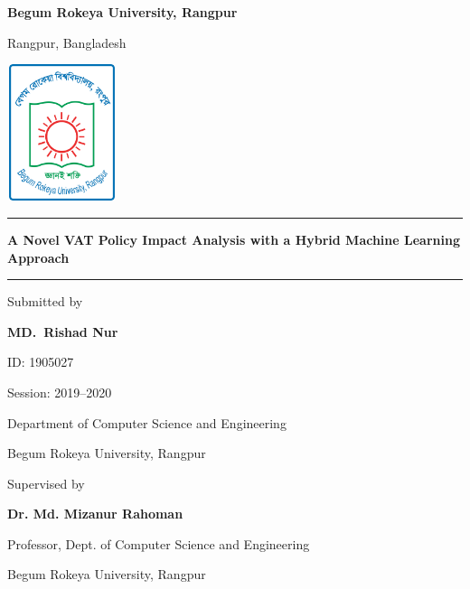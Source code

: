 \begin{titlepage}
    \centering
        
        {\LARGE\bfseries Begum Rokeya University, Rangpur\par}
        {\large Rangpur, Bangladesh\par}
        
        \vspace{1cm}
        
        \includegraphics[width=3.2cm,height=4cm]{images/BRUR_Logo.png}
        
        \vspace{1cm}
        
        \vspace{0.3cm}
        \rule{\textwidth}{0.5pt}

        \vspace{0.6cm}

        {\LARGE\bfseries A Novel VAT Policy Impact Analysis with a Hybrid Machine Learning Approach\par}

        \vspace{0.3cm}
        \rule{\textwidth}{0.4pt}

        \vspace{2cm}
        
        Submitted by\par
        \textbf{MD.\ Rishad Nur}\par
        ID: 1905027\par
        Session: 2019--2020\par
        Department of Computer Science and Engineering\par
        Begum Rokeya University, Rangpur\par

        \vspace{1cm}

        Supervised by\par
        \textbf{Dr. Md. Mizanur Rahoman}\par
        Professor, Dept. of Computer Science and Engineering\par
        Begum Rokeya University, Rangpur\par


\end{titlepage}
